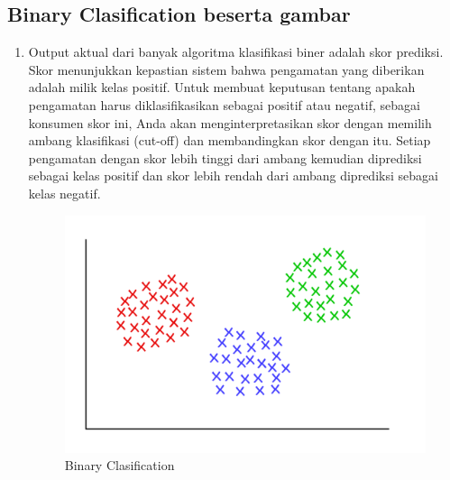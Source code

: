 \subsection{Binary Clasification beserta gambar}
\begin{enumerate}
\item Output aktual dari banyak algoritma klasifikasi biner adalah skor prediksi. Skor menunjukkan kepastian sistem bahwa pengamatan yang diberikan adalah milik kelas positif. Untuk membuat keputusan tentang apakah pengamatan harus diklasifikasikan sebagai positif atau negatif, sebagai konsumen skor ini, Anda akan menginterpretasikan skor dengan memilih ambang klasifikasi (cut-off) dan membandingkan skor dengan itu. Setiap pengamatan dengan skor lebih tinggi dari ambang kemudian diprediksi sebagai kelas positif dan skor lebih rendah dari ambang diprediksi sebagai kelas negatif.

\begin{figure}[ht]
\centering
\includegraphics[scale=0.5]{figures/andi/clustring1.png}
\caption{Binary Clasification}
\label{contoh}
\end{figure}
\end{enumerate}

